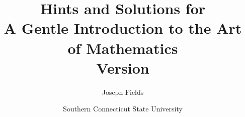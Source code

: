 \documentclass[dvips,12pt,twoside]{book}
\begin{document}
\frontmatter

\title{Hints and Solutions for \\
A Gentle Introduction to the Art of Mathematics\\ {\small Version \versionNum }
}
\author{Joseph Fields}
\date{Southern Connecticut State University}

\maketitle

\clearpage



\clearpage

\tableofcontents

\mainmatter










\end{document}
